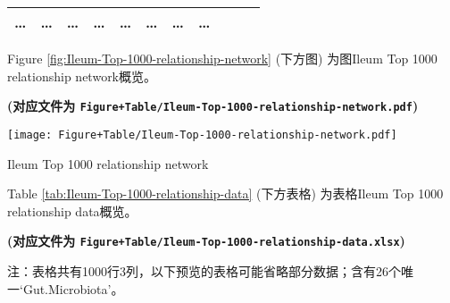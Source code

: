 \documentclass[
]{article}
\begin{document}
\begin{longtable}[]{@{}lllllllllll@{}}
\begin{minipage}[t]{0.09\columnwidth}
\ldots{}\strut
\end{minipage} & \begin{minipage}[t]{0.07\columnwidth}\raggedright
\ldots{}\strut
\end{minipage} & \begin{minipage}[t]{0.07\columnwidth}\raggedright
\ldots{}\strut
\end{minipage} & \begin{minipage}[t]{0.09\columnwidth}\raggedright
\ldots{}\strut
\end{minipage} & \begin{minipage}[t]{0.07\columnwidth}\raggedright
\ldots{}\strut
\end{minipage} & \begin{minipage}[t]{0.07\columnwidth}\raggedright
\ldots{}\strut
\end{minipage} & \begin{minipage}[t]{0.07\columnwidth}\raggedright
\ldots{}\strut
\end{minipage} & \begin{minipage}[t]{0.03\columnwidth}\raggedright
\ldots{}\strut
\end{minipage}\tabularnewline
\bottomrule
\end{longtable}

Figure \ref{fig:Ileum-Top-1000-relationship-network} (下方图) 为图Ileum Top 1000 relationship network概览。

\textbf{(对应文件为 \texttt{Figure+Table/Ileum-Top-1000-relationship-network.pdf})}

\def\@captype{figure}
\begin{center}
\texttt{[image: Figure+Table/Ileum-Top-1000-relationship-network.pdf]}
\caption{Ileum Top 1000 relationship network}\label{fig:Ileum-Top-1000-relationship-network}
\end{center}

Table \ref{tab:Ileum-Top-1000-relationship-data} (下方表格) 为表格Ileum Top 1000 relationship data概览。

\textbf{(对应文件为 \texttt{Figure+Table/Ileum-Top-1000-relationship-data.xlsx})}

\begin{center}\begin{tcolorbox}[colback=gray!10, colframe=gray!50, width=0.9\linewidth, arc=1mm, boxrule=0.5pt]注：表格共有1000行3列，以下预览的表格可能省略部分数据；含有26个唯一`Gut.Microbiota'。
\end{tcolorbox}
\end{center}
\end{document}
